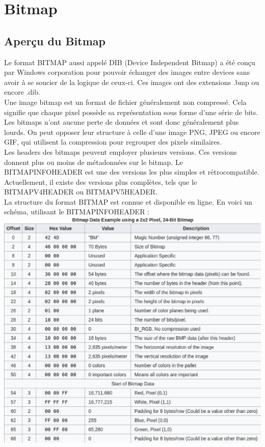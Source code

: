 \section{Bitmap}

\subsection{Aperçu du Bitmap}
Le format BITMAP aussi appelé DIB (Device Independent Bitmap) a été conçu par Windows corporation pour pouvoir échanger des images entre devices sans avoir à se soucier de la logique de ceux-ci.
Ces images ont des extensions .bmp ou encore .dib.\\
Une image bitmap est un format de fichier généralement non compressé. Cela signifie que chaque pixel possède sa représentation sous forme d'une série de bits.
Les bitmaps n'ont aucune perte de données et sont donc généralement plus lourds.
On peut opposer leur structure à celle d'une image PNG, JPEG ou encore GIF, qui utilisent la compression pour regrouper des pixels similaires.\\
Les headers des bitmaps peuvent employer plusieurs versions. Ces versions donnent plus ou moins de métadonnées sur le bitmap. 
Le BITMAPINFOHEADER est une des versions les plus simples et rétrocompatible. 
Actuellement, il existe des versions plus complètes, tels que le BITMAPV4HEADER ou BITMAPV5HEADER.\\
La structure du format BITMAP est connue et disponible en ligne. En voici un schéma, utilisant le BITMAPINFOHEADER :\\

\includegraphics[width=14cm]{bitmap_structure.eps}\\\\

